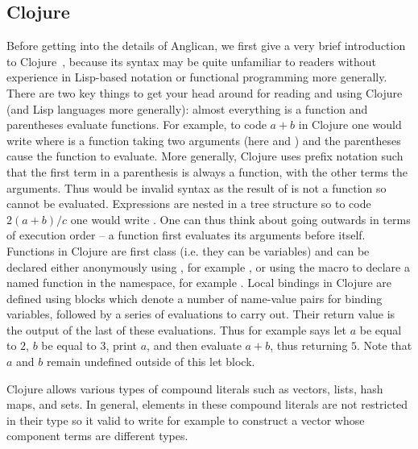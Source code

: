 \subsection{Clojure}
\label{sec:probprog:anglican:clojure} 

Before getting into the details of Anglican, we first give a very brief introduction to Clojure~\citep{hickey2008clojure},
because its syntax may be quite unfamiliar to readers without experience in Lisp-based notation or functional programming
more generally.  There are two key things to get your head around for reading and using Clojure (and Lisp languages more
generally): almost everything is a function and parentheses evaluate functions.  For example, to code $a+b$ in Clojure one
would write {\small {}} where \clj{+} is a function taking two arguments (here  and ) and the parentheses cause the
function to evaluate.  More generally, Clojure uses prefix notation such that 
the first term in a parenthesis is always a function, with the other terms the arguments.
Thus {\small {}} would be invalid syntax as the result of {\small {}}  is not a function so cannot be evaluated.
Expressions are nested in a tree structure so to code $2(a+b)/c$ one would write {\small {}}.  One can
thus think about going outwards in terms of execution order -- a function first evaluates its arguments before
itself.  Functions in Clojure are first class (i.e. they can be variables) and can be declared either anonymously using
{\small {}}, for example {\small {}}, or using the
macro  to declare a named function in the namespace, for example {\small {}}.
Local bindings in Clojure are defined using \cllet blocks which denote a number of name-value pairs for
binding variables, followed by a series of evaluations to  carry out. Their return value
is the output of the last of these evaluations.  Thus for example
{\small {}} says let $a$ be equal to $2$, $b$ be equal to $3$, print $a$,
and then evaluate $a+b$, thus returning $5$.  Note that $a$ and $b$ remain undefined outside of this let block.  

Clojure allows various types of compound literals such as vectors, lists, hash maps, and sets.
In general, elements in these compound literals are not restricted in
their type so it valid to write for example {\small \lsi{[1 (fn [x] (inc x)) "2"]}} to construct a vector 
whose component terms are different types.

